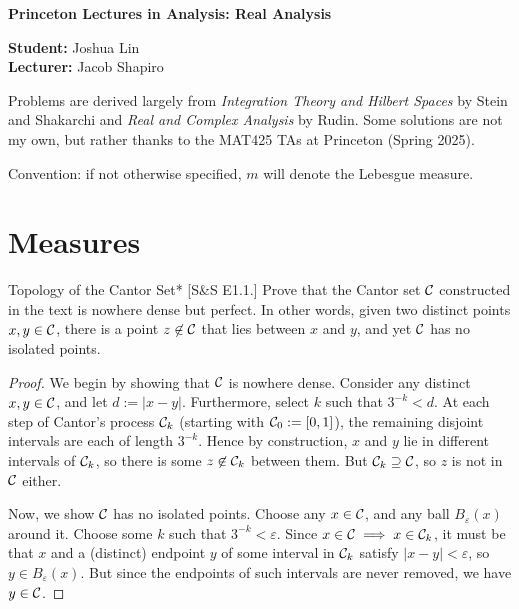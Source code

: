 





\begin{Large}
    \textsf{\textbf{Princeton Lectures in Analysis: Real Analysis}}
\end{Large}

\vspace{1ex}

\textsf{\textbf{Student:}} Joshua Lin \\
\textsf{\textbf{Lecturer:}} Jacob Shapiro

\vspace{2ex}
Problems are derived largely from \textit{Integration Theory and Hilbert Spaces} by Stein and Shakarchi and \textit{Real and Complex Analysis} by Rudin. Some solutions are not my own, but rather thanks to the MAT425 TAs at Princeton (Spring 2025). 
\stdvspace

Convention: if not otherwise specified, \(m\) will denote the Lebesgue measure.

\section{Measures}

\begin{problem}{Topology of the Cantor Set}*
[S\&S E1.1.] Prove that the Cantor set \(\mathcal{C}\) constructed in the text is nowhere dense but perfect. In other words, given two distinct points \(x, y \in \mathcal{C}\), there is a point \(z \not\in \mathcal{C}\) that lies between \(x\) and \(y\), and yet \(\mathcal{C}\) has no isolated points. 
\end{problem}

\begin{proof}
    We begin by showing that \(\mathcal{C}\) is nowhere dense. Consider any distinct \(x, y \in \mathcal{C}\), and let \(d := |x - y|\). Furthermore, select \(k\) such that \(3^{-k} < d\). At each step of Cantor's process \(\mathcal{C}_k\) (starting with \(\mathcal{C}_0 := [0, 1]\)), the remaining disjoint intervals are each of length \(3^{-k}\). Hence by construction, \(x\) and \(y\) lie in different intervals of \(\mathcal{C}_k\), so there is some \(z \not\in \mathcal{C}_k\) between them. But \(\mathcal{C}_k \supseteq \mathcal{C}\), so \(z\) is not in \(\mathcal{C}\) either. 
    \stdvspace

    Now, we show \(\mathcal{C}\) has no isolated points. Choose any \(x \in \mathcal{C}\), and any ball \(B_{\varepsilon}(x)\) around it. Choose some \(k\) such that \(3^{-k} < \varepsilon\). Since \(x \in \mathcal{C} \implies x \in \mathcal{C}_k\), it must be that \(x\) and a (distinct) endpoint \(y\) of some interval in \(\mathcal{C}_k\) satisfy \(|x - y| < \varepsilon\), so \(y \in B_{\varepsilon}(x)\). But since the endpoints of such intervals are never removed, we have \(y \in \mathcal{C}\). 
\end{proof}

